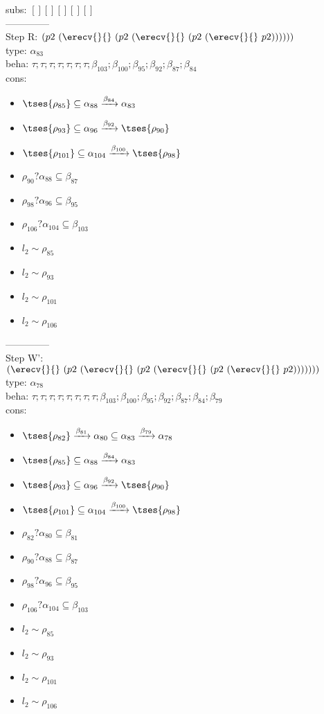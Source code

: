 \documentclass[12pt]{article}
\begin{document}
 subs:  $ [ ] [] [] [] [] $ 
  \\--------------\\ 
Step R: $ (p2~(\erecv{}{}~(p2~(\erecv{}{}~(p2~(\erecv{}{}~p2)))))) $\\
  type: $ \alpha_{83} $ 
\\  beha: $ \tau; \tau; \tau; \tau; \tau; \tau; \tau; \beta_{103}; \beta_{100}; \beta_{95}; \beta_{92}; \beta_{87}; \beta_{84} $ 
\\  cons: \begin{itemize}
\item $  \tses{ \rho_{85}} \subseteq \alpha_{88} \xrightarrow{\beta_{84}} \alpha_{83} $
\item $  \tses{ \rho_{93}} \subseteq \alpha_{96} \xrightarrow{\beta_{92}}  \tses{ \rho_{90}} $
\item $  \tses{ \rho_{101}} \subseteq \alpha_{104} \xrightarrow{\beta_{100}}  \tses{ \rho_{98}} $
\item $ \rho_{90}?\alpha_{88} \subseteq \beta_{87} $
\item $ \rho_{98}?\alpha_{96} \subseteq \beta_{95} $
\item $ \rho_{106}?\alpha_{104} \subseteq \beta_{103} $
\item $ l_{2} \sim\rho_{85} $
\item $ l_{2} \sim\rho_{93} $
\item $ l_{2} \sim\rho_{101} $
\item $ l_{2} \sim\rho_{106} $
\end{itemize} 
  --------------\\ 
Step W': $ (\erecv{}{}~(p2~(\erecv{}{}~(p2~(\erecv{}{}~(p2~(\erecv{}{}~p2))))))) $\\
  type: $ \alpha_{78} $ 
\\  beha: $ \tau; \tau; \tau; \tau; \tau; \tau; \tau; \tau; \beta_{103}; \beta_{100}; \beta_{95}; \beta_{92}; \beta_{87}; \beta_{84}; \beta_{79} $ 
\\  cons: \begin{itemize}
\item $  \tses{ \rho_{82}} \xrightarrow{\beta_{81}} \alpha_{80} \subseteq \alpha_{83} \xrightarrow{\beta_{79}} \alpha_{78} $
\item $  \tses{ \rho_{85}} \subseteq \alpha_{88} \xrightarrow{\beta_{84}} \alpha_{83} $
\item $  \tses{ \rho_{93}} \subseteq \alpha_{96} \xrightarrow{\beta_{92}}  \tses{ \rho_{90}} $
\item $  \tses{ \rho_{101}} \subseteq \alpha_{104} \xrightarrow{\beta_{100}}  \tses{ \rho_{98}} $
\item $ \rho_{82}?\alpha_{80} \subseteq \beta_{81} $
\item $ \rho_{90}?\alpha_{88} \subseteq \beta_{87} $
\item $ \rho_{98}?\alpha_{96} \subseteq \beta_{95} $
\item $ \rho_{106}?\alpha_{104} \subseteq \beta_{103} $
\item $ l_{2} \sim\rho_{85} $
\item $ l_{2} \sim\rho_{93} $
\item $ l_{2} \sim\rho_{101} $
\item $ l_{2} \sim\rho_{106} $
\end{itemize} 
\end{document}
